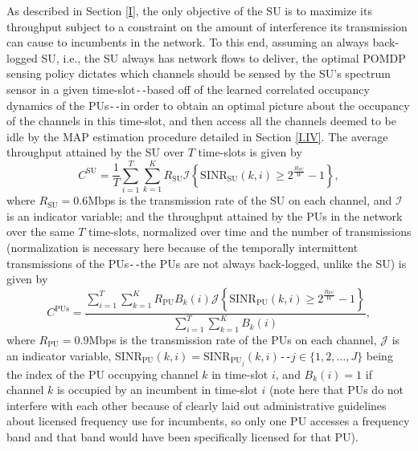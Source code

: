 As described in Section \ref{I}, the only objective of the SU is to maximize its throughput subject to a constraint on the amount of interference its transmission can cause to incumbents in the network. To this end, assuming an always back-logged SU, i.e., the SU always has network flows to deliver, the optimal POMDP sensing policy dictates which channels should be sensed by the SU's spectrum sensor in a given time-slot\texttt{-{}-}based off of the learned correlated occupancy dynamics of the PUs\texttt{-{}-}in order to obtain an optimal picture about the occupancy of the channels in this time-slot, and then access all the channels deemed to be idle by the MAP estimation procedure detailed in Section \ref{I.IV}. The average throughput attained by the SU over $T$ time-slots is given by
\begin{equation}\label{30}
    C^{\text{SU}}=\frac{1}{T}\sum_{i=1}^{T}\sum_{k=1}^{K}R_{\text{SU}}\mathcal{I}\left\{\text{SINR}_{\text{SU}}(k,i) \geq 2^{\frac{R_{\text{SU}}}{W}}-1\right\},
\end{equation}
where $R_{\text{SU}}{=}0.6$Mbps is the transmission rate of the SU on each channel, and $\mathcal{I}$ is an indicator variable; and the throughput attained by the PUs in the network over the same $T$ time-slots, normalized over time and the number of transmissions (normalization is necessary here because of the temporally intermittent transmissions of the PUs\texttt{-{}-}the PUs are not always back-logged, unlike the SU) is given by
\begin{equation}\label{31}
    C^{\text{PUs}}=\frac{\sum_{i=1}^{T}\sum_{k=1}^{K}R_{\text{PU}}B_{k}(i)\mathcal{J}\left\{\text{SINR}_{\text{PU}}(k,i) \geq 2^{\frac{R_{\text{PU}}}{W}}-1\right\}}{\sum_{i=1}^{T}\sum_{k=1}^{K}B_{k}(i)},
\end{equation}
where $R_{\text{PU}}{=}0.9$Mbps is the transmission rate of the PUs on each channel, $\mathcal{J}$ is an indicator variable, $\text{SINR}_{\text{PU}}(k,i){=}\text{SINR}_{\text{PU}_{j}}(k,i)$\texttt{-{}-}$j{\in}\{1,2,\dots,J\}$ being the index of the PU occupying channel $k$ in time-slot $i$, and $B_{k}(i){=}1$ if channel $k$ is occupied by an incumbent in time-slot $i$ (note here that PUs do not interfere with each other because of clearly laid out administrative guidelines about licensed frequency use for incumbents, so only one PU accesses a frequency band and that band would have been specifically licensed for that PU).
